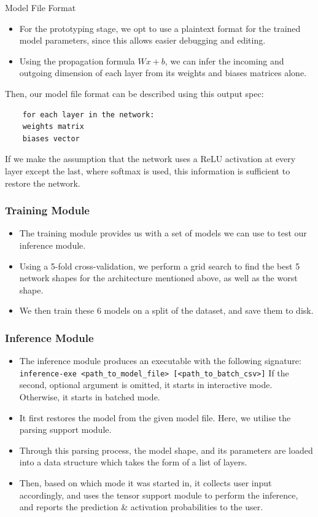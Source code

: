 \documentclass{beamer}
\begin{document}
\begin{frame}[fragile]{Model File Format}
  \begin{itemize}
    \item For the prototyping stage, we opt to use a plaintext format for the trained model parameters, since this allows easier debugging and editing.
    \item<2-> Using the propagation formula $Wx + b$, we can infer the incoming and outgoing dimension of each layer from its weights and biases matrices alone.
  \end{itemize}
  \pause
  \pause
  Then, our model file format can be described using this output spec:
  \begin{verbatim}
    for each layer in the network:
    weights matrix
    biases vector
  \end{verbatim}
  \vspace*{-16pt}
  If we make the assumption that the network uses a ReLU activation at every layer except the last, where softmax is used, this information is sufficient to restore the network.
\end{frame}

\begin{frame}
  \frametitle{Training Module}

  \begin{itemize}
    \item The training module provides us with a set of models we can use to test our inference module.
    \item<2-> Using a 5-fold cross-validation, we perform a grid search to find the best 5 network shapes for the architecture mentioned above, as well as the worst shape.
    \item<3-> We then train these 6 models on a split of the dataset, and save them to disk.
  \end{itemize}

\end{frame}

\begin{frame}[fragile]
  \frametitle{Inference Module}

  \begin{itemize}
    \item The inference module produces an executable with the following signature: \verb|inference-exe <path_to_model_file> [<path_to_batch_csv>]|
    If the second, optional argument is omitted, it starts in interactive mode. Otherwise, it starts in batched mode.
    \item<2-> It first restores the model from the given model file. Here, we utilise the parsing support module.
    \item<3-> Through this parsing process, the model shape, and its parameters are loaded into a data structure which takes the form of a list of layers.
    \item<4-> Then, based on which mode it was started in, it collects user input accordingly, and uses the tensor support module to perform the inference, and reports the prediction \& activation probabilities to the user.
  \end{itemize}

\end{frame}
\end{document}
